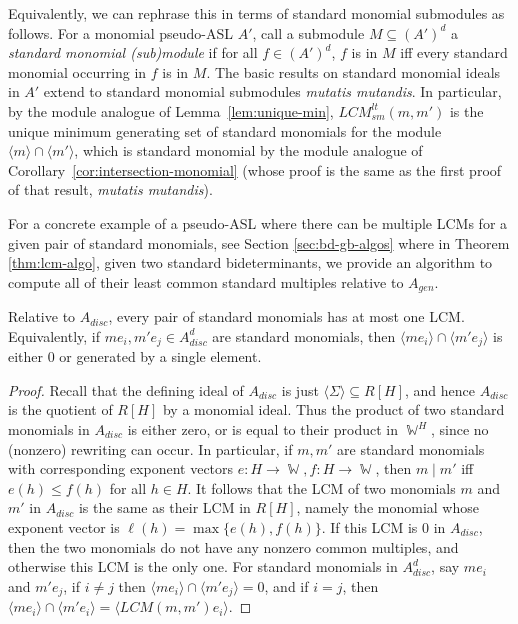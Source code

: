 \documentclass[11pt,reqno]{amsart}
\DeclareMathOperator{\W}{\mathbb{W}}
\newcommand{\divides}{\mid}
\newcommand{\lcmlt}{LCM_{sm}^{lt}}
\theoremstyle{definition}
\numberwithin{equation}{section}
\begin{document}
Equivalently, we can rephrase this in terms of standard monomial submodules as follows. For a monomial pseudo-ASL $A'$, call a submodule $M \subseteq (A')^d$ a \emph{standard monomial (sub)module} if for all $f \in (A')^d$, $f$ is in $M$ iff every standard monomial occurring in $f$ is in $M$. The basic results on standard monomial ideals in $A'$ extend to standard monomial submodules \emph{mutatis mutandis}. In particular, by the module analogue of Lemma~\ref{lem:unique-min}, $\lcmlt(m,m')$ is the unique minimum generating set of standard monomials for the module $\langle m \rangle \cap \langle m' \rangle$, which is standard monomial by the module analogue of Corollary~\ref{cor:intersection-monomial} (whose proof is the same as the first proof of that result, \emph{mutatis mutandis}). 

For a concrete example of a pseudo-ASL where there can be multiple LCMs for a given pair of standard monomials, see Section \ref{sec:bd-gb-algos} where in Theorem \ref{thm:lcm-algo}, given two standard bideterminants, we provide an algorithm to compute all of their least common standard multiples relative to $A_{gen}$.

\begin{observation} \label{obs:lcm-unique-disc}
Relative to $A_{disc}$, every pair of standard monomials has at most one LCM. Equivalently, if $me_i ,m'e_j \in A_{disc}^d$ are standard monomials, then $\langle me_i \rangle \cap \langle m'e_j \rangle$ is either 0 or generated by a single element.
\end{observation}

\begin{proof}
Recall that the defining ideal of $A_{disc}$ is just $\langle \Sigma \rangle \subseteq R[H]$, and hence $A_{disc}$ is the quotient of $R[H]$ by a monomial ideal. Thus the product of two standard monomials in $A_{disc}$ is either zero, or is equal to their product in $\W^H$, since no (nonzero) rewriting can occur. In particular, if $m,m'$ are standard monomials with corresponding exponent vectors $e \colon H \to \W, f \colon H \to \W$, then $m \divides m'$ iff $e(h) \leq f(h)$ for all $h \in H$. It follows that the LCM of two monomials $m$ and $m'$ in $A_{disc}$ is the same as their LCM in $R[H]$, namely the monomial whose exponent vector is $\ell(h) = \max\{e(h), f(h)\}$. If this LCM is 0 in $A_{disc}$, then the two monomials do not have any nonzero common multiples, and otherwise this LCM is the only one. For standard monomials in $A_{disc}^d$, say $m e_i$ and $m'e_j$, if $i \neq j$ then $\langle me_i \rangle \cap \langle m'e_j \rangle = 0$, and if $i = j$, then $\langle me_i \rangle \cap \langle m'e_i \rangle = \langle LCM(m,m') e_i \rangle$.
\end{proof}
\end{document}
